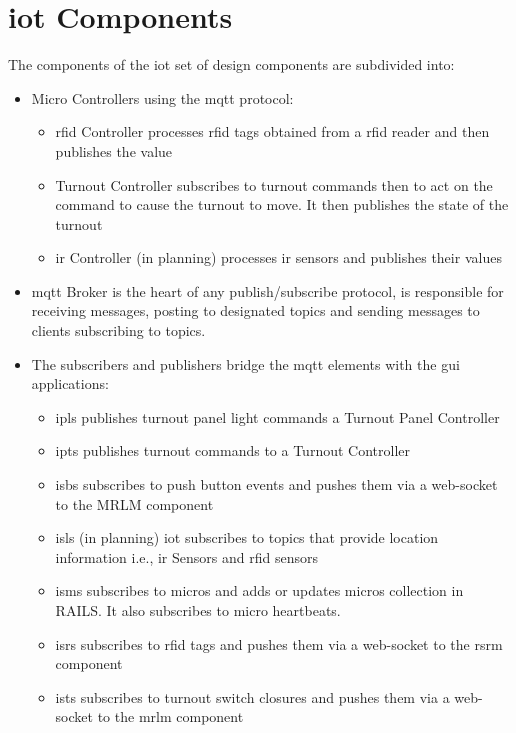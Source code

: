 \section{\gls{iot} Components}
The components of the \gls{iot} set of design components are subdivided into:
\begin{itemize}
  \item Micro Controllers using the \gls{mqtt} protocol:
\begin{itemize}
  \item \gls{rfid} Controller processes \gls{rfid} tags obtained from a \gls{rfid} reader and then publishes the value
  \item Turnout Controller subscribes to turnout commands then to act on the command to cause the turnout to move. It then publishes the state of the turnout
  \item \gls{ir} Controller (in planning) processes \gls{ir} sensors and publishes their values
\end{itemize}
  \item \gls{mqtt} Broker is the heart of any publish/subscribe protocol, is responsible for receiving messages, posting to designated topics and sending messages to clients subscribing to topics.
  \item The subscribers and publishers bridge the \gls{mqtt} elements with the \gls{gui} applications:
\begin{itemize}
  \item \gls{ipls} publishes turnout panel light commands a Turnout Panel Controller
  \item \gls{ipts} publishes turnout commands to a Turnout Controller
  \item \gls{isbs}  subscribes to push button events and pushes them via a web-socket to the MRLM component
  \item \gls{isls} (in planning) \gls{iot} subscribes to topics that provide location information i.e., \gls{ir} Sensors and \gls{rfid} sensors
  \item \gls{isms} subscribes to micros and adds or updates micros collection in RAILS. It also subscribes to micro heartbeats.
  \item \gls{isrs} subscribes to \gls{rfid} tags and pushes them via a web-socket to the \gls{rsrm} component
  \item \gls{ists} subscribes to turnout switch closures and pushes them via a web-socket to the \gls{mrlm} component
\end{itemize}
\end{itemize}
